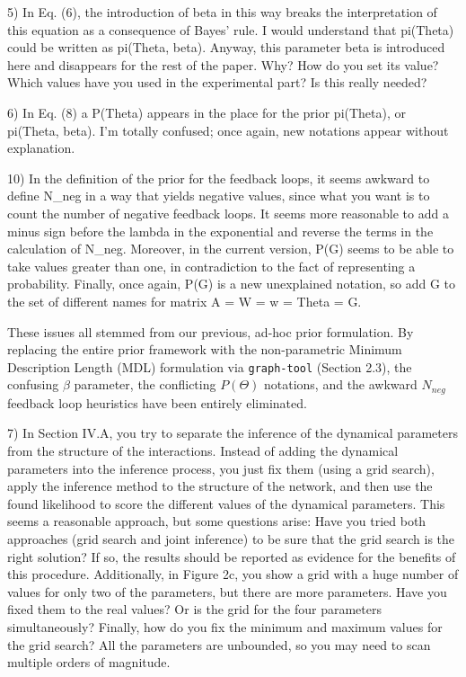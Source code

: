 \documentclass[11pt,a4paper]{article}
\begin{document}
\begin{reviewercomment}
5) In Eq. (6), the introduction of beta in this way breaks the interpretation of this equation as a consequence of Bayes' rule. I would understand that pi(Theta) could be written as pi(Theta, beta). Anyway, this parameter beta is introduced here and disappears for the rest of the paper. Why? How do you set its value? Which values have you used in the experimental part? Is this really needed?

6) In Eq. (8) a P(Theta) appears in the place for the prior pi(Theta), or pi(Theta, beta). I’m totally confused; once again, new notations appear without explanation.

10) In the definition of the prior for the feedback loops, it seems awkward to define N\_neg in a way that yields negative values, since what you want is to count the number of negative feedback loops. It seems more reasonable to add a minus sign before the lambda in the exponential and reverse the terms in the calculation of N\_neg. Moreover, in the current version, P(G) seems to be able to take values greater than one, in contradiction to the fact of representing a probability. Finally, once again, P(G) is a new unexplained notation, so add G to the set of different names for matrix A = W = w = Theta = G.
\end{reviewercomment}

These issues all stemmed from our previous, ad-hoc prior formulation. By replacing the entire prior framework with the non-parametric Minimum Description Length (MDL) formulation via \texttt{graph-tool} (Section 2.3), the confusing $\beta$ parameter, the conflicting $P(\Theta)$ notations, and the awkward $N_{neg}$ feedback loop heuristics have been entirely eliminated. 

\begin{reviewercomment}
7) In Section IV.A, you try to separate the inference of the dynamical parameters from the structure of the interactions. Instead of adding the dynamical parameters into the inference process, you just fix them (using a grid search), apply the inference method to the structure of the network, and then use the found likelihood to score the different values of the dynamical parameters. This seems a reasonable approach, but some questions arise: Have you tried both approaches (grid search and joint inference) to be sure that the grid search is the right solution? If so, the results should be reported as evidence for the benefits of this procedure. Additionally, in Figure 2c, you show a grid with a huge number of values for only two of the parameters, but there are more parameters. Have you fixed them to the real values? Or is the grid for the four parameters simultaneously? Finally, how do you fix the minimum and maximum values for the grid search? All the parameters are unbounded, so you may need to scan multiple orders of magnitude.
\end{reviewercomment}
\end{document}
